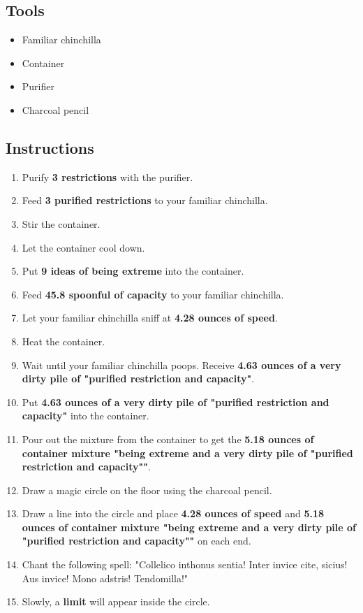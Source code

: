 \documentclass{article}
\begin{document}
\subsection{Tools}\begin{itemize}
\item 
Familiar chinchilla
\item 
Container
\item 
Purifier
\item 
Charcoal pencil
\end{itemize}
\subsection{Instructions}\begin{enumerate}
\item 
Purify \textbf{3 restrictions} with the purifier.
\item 
Feed \textbf{3 purified restrictions} to your familiar chinchilla.
\item 
Stir the container.
\item 
Let the container cool down.
\item 
Put \textbf{9 ideas of being extreme} into the container.
\item 
Feed \textbf{45.8 spoonful of capacity} to your familiar chinchilla.
\item 
Let your familiar chinchilla sniff at \textbf{4.28 ounces of speed}.
\item 
Heat the container.
\item 
Wait until your familiar chinchilla poops. Receive \textbf{4.63 ounces of a very dirty pile of "purified restriction and capacity"}.
\item 
Put \textbf{4.63 ounces of a very dirty pile of "purified restriction and capacity"} into the container.
\item 
Pour out the mixture from the container to get the \textbf{5.18 ounces of container mixture "being extreme and a very dirty pile of "purified restriction and capacity""}.
\item 
Draw a magic circle on the floor using the charcoal pencil.
\item 
Draw a line into the circle and place \textbf{4.28 ounces of speed} and \textbf{5.18 ounces of container mixture "being extreme and a very dirty pile of "purified restriction and capacity""} on each end.
\item 
Chant the following spell: "Collelico inthonus sentia! Inter invice cite, sicius! Aus invice! Mono adstris! Tendomilla!"
\item 
Slowly, a \textbf{limit} will appear inside the circle.
\end{enumerate}
\newpage
\end{document}
